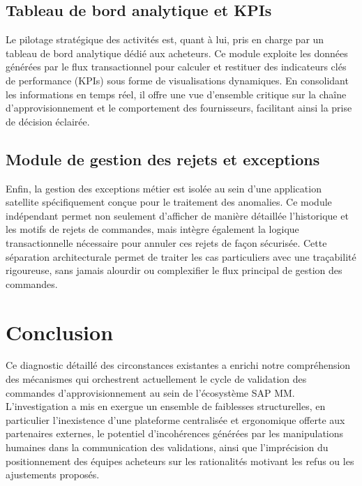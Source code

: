 \documentclass[12pt,a4paper,oneside]{report}
\begin{document}
\subsection{Tableau de bord analytique et KPIs}\label{ch3:confirm-masse}

Le pilotage stratégique des activités est, quant à lui, pris en charge par un tableau de bord analytique dédié aux acheteurs. Ce module exploite les données générées par le flux transactionnel pour calculer et restituer des indicateurs clés de performance (KPIs) sous forme de visualisations dynamiques. En consolidant les informations en temps réel, il offre une vue d'ensemble critique sur la chaîne d'approvisionnement et le comportement des fournisseurs, facilitant ainsi la prise de décision éclairée.

\subsection{Module de gestion des rejets et exceptions }\label{ch3:rejet-comm}

Enfin, la gestion des exceptions métier est isolée au sein d'une application satellite spécifiquement conçue pour le traitement des anomalies. Ce module indépendant permet non seulement d'afficher de manière détaillée l'historique et les motifs de rejets de commandes, mais intègre également la logique transactionnelle nécessaire pour annuler ces rejets de façon sécurisée. Cette séparation architecturale permet de traiter les cas particuliers avec une traçabilité rigoureuse, sans jamais alourdir ou complexifier le flux principal de gestion des commandes.

\section{Conclusion}\label{ch3:conclusion}

Ce diagnostic détaillé des circonstances existantes a enrichi notre compréhension des mécanismes qui orchestrent actuellement le cycle de validation des commandes d'approvisionnement au sein de l'écosystème SAP MM. L'investigation a mis en exergue un ensemble de faiblesses structurelles, en particulier l'inexistence d'une plateforme centralisée et ergonomique offerte aux partenaires externes, le potentiel d'incohérences générées par les manipulations humaines dans la communication des validations, ainsi que l'imprécision du positionnement des équipes acheteurs sur les rationalités motivant les refus ou les ajustements proposés.
\end{document}
